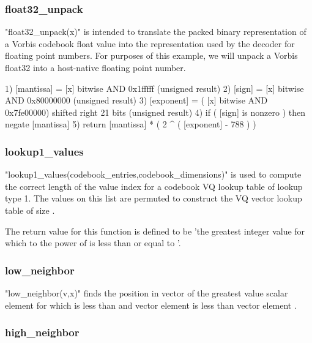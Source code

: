 \subsubsection{float32_unpack} \label{vorbis:spec:float32:unpack}

"float32_unpack(x)" is intended to translate the packed binary
representation of a Vorbis codebook float value into the
representation used by the decoder for floating point numbers.  For
purposes of this example, we will unpack a Vorbis float32 into a
host-native floating point number.

\begin{programlisting}
  1) [mantissa] = [x] bitwise AND 0x1fffff (unsigned result)
  2) [sign] = [x] bitwise AND 0x80000000 (unsigned result)
  3) [exponent] = ( [x] bitwise AND 0x7fe00000) shifted right 21 bits (unsigned result)
  4) if ( [sign] is nonzero ) then negate [mantissa]
  5) return [mantissa] * ( 2 ^ ( [exponent] - 788 ) )
\end{programlisting}



\subsubsection{lookup1_values} \label{vorbis:spec:lookup1:values}

"lookup1_values(codebook_entries,codebook_dimensions)" is used to
compute the correct length of the value index for a codebook VQ lookup
table of lookup type 1.  The values on this list are permuted to
construct the VQ vector lookup table of size
.

The return value for this function is defined to be 'the greatest
integer value for which  to the power of
 is less than or equal to
'.



\subsubsection{low_neighbor} \label{vorbis:spec:low:neighbor}

"low_neighbor(v,x)" finds the position  in vector \varname{[v]} of
the greatest value scalar element for which  is less than
\varname{[x]} and vector \varname{[v]} element  is less
than vector \varname{[v]} element \varname{[x]}.

\subsubsection{high_neighbor} \label{vorbis:spec:high:neighbor}

